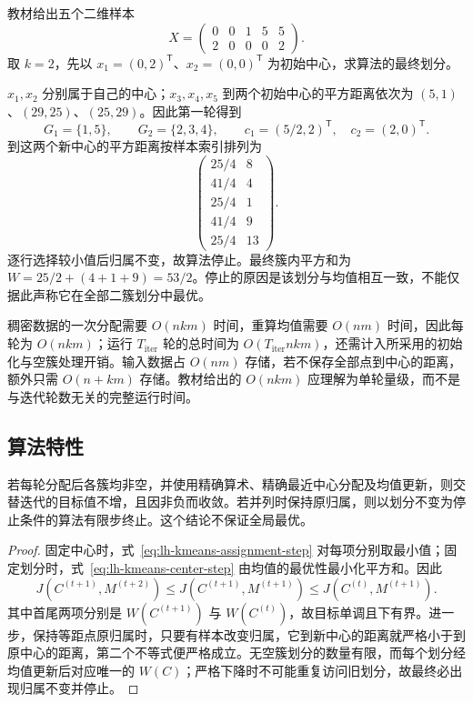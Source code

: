 \begin{example}
\label{ex:lh-kmeans-five}
教材给出五个二维样本
\[
X=\begin{pmatrix}0&0&1&5&5\\2&0&0&0&2\end{pmatrix}.
\]
取 $k=2$，先以 $x_1=(0,2)^{\mathsf T}$、$x_2=(0,0)^{\mathsf T}$ 为初始中心，求算法的最终划分。
\end{example}
\begin{solve}
$x_1,x_2$ 分别属于自己的中心；$x_3,x_4,x_5$ 到两个初始中心的平方距离依次为 $(5,1)$、$(29,25)$、$(25,29)$。因此第一轮得到
\[
G_1=\{1,5\},\qquad G_2=\{2,3,4\},\qquad
c_1=(5/2,2)^{\mathsf T},\quad c_2=(2,0)^{\mathsf T}.
\]
到这两个新中心的平方距离按样本索引排列为
\[
\begin{pmatrix}
25/4&8\\41/4&4\\25/4&1\\41/4&9\\25/4&13
\end{pmatrix}.
\]
逐行选择较小值后归属不变，故算法停止。最终簇内平方和为 $W=25/2+(4+1+9)=53/2$。停止的原因是该划分与均值相互一致，不能仅据此声称它在全部二簇划分中最优。
\end{solve}

稠密数据的一次分配需要 $O(nkm)$ 时间，重算均值需要 $O(nm)$ 时间，因此每轮为 $O(nkm)$；运行 $T_{\mathrm{iter}}$ 轮的总时间为 $O(T_{\mathrm{iter}}nkm)$，还需计入所采用的初始化与空簇处理开销。输入数据占 $O(nm)$ 存储，若不保存全部点到中心的距离，额外只需 $O(n+km)$ 存储。教材给出的 $O(nkm)$ 应理解为单轮量级，而不是与迭代轮数无关的完整运行时间。

\subsection{算法特性}
\label{subsec:lh-kmeans-properties}

\begin{proposition}[目标单调性与有条件的有限终止]
\label{prop:lh-kmeans-convergence}
若每轮分配后各簇均非空，并使用精确算术、精确最近中心分配及均值更新，则交替迭代的目标值不增，且因非负而收敛。若并列时保持原归属，则以划分不变为停止条件的算法有限步终止。这个结论不保证全局最优。
\end{proposition}
\begin{proof}
固定中心时，式~\eqref{eq:lh-kmeans-assignment-step} 对每项分别取最小值；固定划分时，式~\eqref{eq:lh-kmeans-center-step} 由均值的最优性最小化平方和。因此
\begin{equation}
J(C^{(t+1)},M^{(t+2)})
\leq J(C^{(t+1)},M^{(t+1)})
\leq J(C^{(t)},M^{(t+1)}).
\label{eq:lh-kmeans-descent}
\end{equation}
其中首尾两项分别是 $W(C^{(t+1)})$ 与 $W(C^{(t)})$，故目标单调且下有界。进一步，保持等距点原归属时，只要有样本改变归属，它到新中心的距离就严格小于到原中心的距离，第二个不等式便严格成立。无空簇划分的数量有限，而每个划分经均值更新后对应唯一的 $W(C)$；严格下降时不可能重复访问旧划分，故最终必出现归属不变并停止。
\end{proof}

